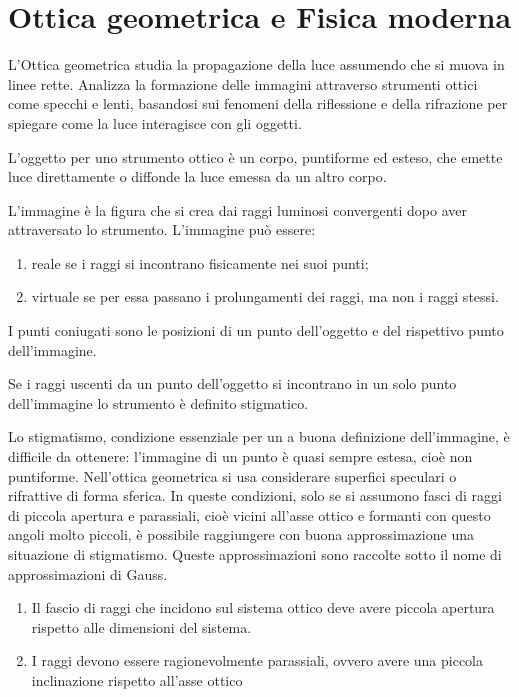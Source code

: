 \chapter{Ottica geometrica e Fisica moderna}
L'Ottica geometrica studia la propagazione della luce assumendo che si muova in linee rette. Analizza la formazione delle immagini attraverso strumenti ottici come specchi e lenti, basandosi sui fenomeni della riflessione e della rifrazione per spiegare come la luce interagisce con gli oggetti.
\begin{defn}[oggetto]
    L'oggetto per uno strumento ottico è un corpo, puntiforme ed esteso, che emette luce direttamente o diffonde la luce emessa da un altro corpo.
\end{defn}
\begin{defn}[immagine]
    L'immagine è la figura che si crea dai raggi luminosi convergenti dopo aver attraversato lo strumento. L'immagine può essere:
    \begin{enumerate}
        \item reale se i raggi si incontrano fisicamente nei suoi punti;
        \item virtuale se per essa passano i prolungamenti dei raggi, ma non i raggi stessi.
    \end{enumerate}
\end{defn}
\begin{defn}
    I punti coniugati sono le posizioni di un punto dell'oggetto e del rispettivo punto dell'immagine.
\end{defn}
\begin{defn}[stigmatismo]
    Se i raggi uscenti da un punto dell'oggetto si incontrano in un solo punto dell'immagine lo strumento è definito stigmatico.
\end{defn}
Lo stigmatismo, condizione essenziale per un a buona definizione dell'immagine, è difficile da ottenere: l'immagine di un punto è quasi sempre estesa, cioè non puntiforme. Nell'ottica geometrica si usa considerare superfici speculari o rifrattive di forma sferica. In queste condizioni, solo se si assumono fasci di raggi di piccola apertura e parassiali, cioè vicini all'asse ottico e formanti con questo angoli molto piccoli, è possibile raggiungere con buona approssimazione una situazione di stigmatismo. Queste approssimazioni sono raccolte sotto il nome di approssimazioni di Gauss.
\begin{axiom}\hfill
    \begin{enumerate}
        \item Il fascio di raggi che incidono sul sistema ottico deve avere piccola apertura rispetto alle dimensioni del sistema.
        \item I raggi devono essere ragionevolmente parassiali, ovvero avere una piccola inclinazione rispetto all'asse ottico
    \end{enumerate}
\end{axiom}
